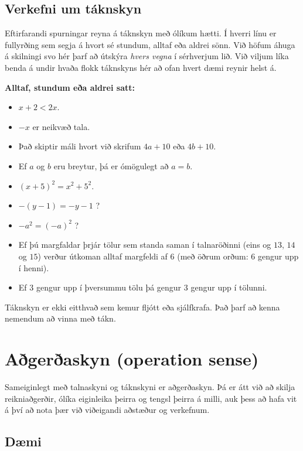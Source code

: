 \documentclass[
  icelandic,
]{book}
\providecommand{\tightlist}{%
  \setlength{\itemsep}{0pt}\setlength{\parskip}{0pt}}
\begin{document}
\subsection{Verkefni um táknskyn}\label{verkefni-um-tuxe1knskyn}

Eftirfarandi spurningar reyna á táknskyn með ólíkum hætti. Í hverri línu er fullyrðing sem segja á hvort sé stundum, alltaf eða aldrei sönn. Við höfum áhuga á skilningi svo hér þarf að útskýra \emph{hvers vegna} í sérhverjum lið. Við viljum líka benda á undir hvaða flokk táknskyns hér að ofan hvert dæmi reynir helst á.

\textbf{Alltaf, stundum eða aldrei satt:}

\begin{itemize}
\tightlist
\item
  \(x+2 < 2x\).
\item
  \(-x\) er neikvæð tala.
\item
  Það skiptir máli hvort við skrifum \(4a+10\) eða \(4b+10\).
\item
  Ef \(a\) og \(b\) eru breytur, þá er ómögulegt að \(a=b\).
\item
  \((x+5)^2 = x^2 + 5^2\).
\item
  \(-(y-1) = -y -1\) ?
\item
  \(-a^2 = (-a)^2\) ?
\item
  Ef þú margfaldar þrjár tölur sem standa saman í talnaröðinni (eins og \(13\), \(14\) og \(15\)) verður útkoman alltaf margfeldi af \(6\) (með öðrum orðum: \(6\) gengur upp í henni).
\item
  Ef \(3\) gengur upp í þversummu tölu þá gengur \(3\) gengur upp í tölunni.
\end{itemize}

Táknskyn er ekki eitthvað sem kemur fljótt eða sjálfkrafa. Það þarf að kenna nemendum að vinna með tákn.

\section{Aðgerðaskyn (operation sense)}\label{auxf0geruxf0askyn-operation-sense}

Sameiginlegt með talnaskyni og táknskyni er aðgerðaskyn. Þá er átt við að skilja reikniaðgerðir, ólíka eiginleika þeirra og tengsl þeirra á milli, auk þess að hafa vit á því að nota þær við viðeigandi aðstæður og verkefnum.

\subsection{Dæmi}\label{duxe6mi-1}
\end{document}
